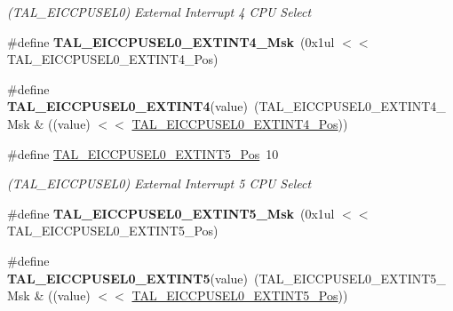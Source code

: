 \begin{DoxyCompactItemize}
\begin{DoxyCompactList}\small\item\em (T\+A\+L\+\_\+\+E\+I\+C\+C\+P\+U\+S\+E\+L0) External Interrupt 4 C\+P\+U Select \end{DoxyCompactList}\item 
\hypertarget{group___s_a_m_l21___t_a_l_ga9080df94c0c1a796c89316d313a6b49e}{}\#define {\bfseries T\+A\+L\+\_\+\+E\+I\+C\+C\+P\+U\+S\+E\+L0\+\_\+\+E\+X\+T\+I\+N\+T4\+\_\+\+Msk}~(0x1ul $<$$<$ T\+A\+L\+\_\+\+E\+I\+C\+C\+P\+U\+S\+E\+L0\+\_\+\+E\+X\+T\+I\+N\+T4\+\_\+\+Pos)\label{group___s_a_m_l21___t_a_l_ga9080df94c0c1a796c89316d313a6b49e}

\item 
\hypertarget{group___s_a_m_l21___t_a_l_ga6c6ce30ffe093c29e71b6a7fa98b4709}{}\#define {\bfseries T\+A\+L\+\_\+\+E\+I\+C\+C\+P\+U\+S\+E\+L0\+\_\+\+E\+X\+T\+I\+N\+T4}(value)~(T\+A\+L\+\_\+\+E\+I\+C\+C\+P\+U\+S\+E\+L0\+\_\+\+E\+X\+T\+I\+N\+T4\+\_\+\+Msk \& ((value) $<$$<$ \hyperlink{group___s_a_m_l21___t_a_l_gabf21e1c2dfcc285c676b41993b40dadd}{T\+A\+L\+\_\+\+E\+I\+C\+C\+P\+U\+S\+E\+L0\+\_\+\+E\+X\+T\+I\+N\+T4\+\_\+\+Pos}))\label{group___s_a_m_l21___t_a_l_ga6c6ce30ffe093c29e71b6a7fa98b4709}

\item 
\hypertarget{group___s_a_m_l21___t_a_l_ga9b495a36373e9ca710d53e7a55e7f016}{}\#define \hyperlink{group___s_a_m_l21___t_a_l_ga9b495a36373e9ca710d53e7a55e7f016}{T\+A\+L\+\_\+\+E\+I\+C\+C\+P\+U\+S\+E\+L0\+\_\+\+E\+X\+T\+I\+N\+T5\+\_\+\+Pos}~10\label{group___s_a_m_l21___t_a_l_ga9b495a36373e9ca710d53e7a55e7f016}

\begin{DoxyCompactList}\small\item\em (T\+A\+L\+\_\+\+E\+I\+C\+C\+P\+U\+S\+E\+L0) External Interrupt 5 C\+P\+U Select \end{DoxyCompactList}\item 
\hypertarget{group___s_a_m_l21___t_a_l_gaa1b8d5d4fdfd744dd8d7fe0d73b362a1}{}\#define {\bfseries T\+A\+L\+\_\+\+E\+I\+C\+C\+P\+U\+S\+E\+L0\+\_\+\+E\+X\+T\+I\+N\+T5\+\_\+\+Msk}~(0x1ul $<$$<$ T\+A\+L\+\_\+\+E\+I\+C\+C\+P\+U\+S\+E\+L0\+\_\+\+E\+X\+T\+I\+N\+T5\+\_\+\+Pos)\label{group___s_a_m_l21___t_a_l_gaa1b8d5d4fdfd744dd8d7fe0d73b362a1}

\item 
\hypertarget{group___s_a_m_l21___t_a_l_gab7fbd7d0d232c592ad5cca3b69a79319}{}\#define {\bfseries T\+A\+L\+\_\+\+E\+I\+C\+C\+P\+U\+S\+E\+L0\+\_\+\+E\+X\+T\+I\+N\+T5}(value)~(T\+A\+L\+\_\+\+E\+I\+C\+C\+P\+U\+S\+E\+L0\+\_\+\+E\+X\+T\+I\+N\+T5\+\_\+\+Msk \& ((value) $<$$<$ \hyperlink{group___s_a_m_l21___t_a_l_ga9b495a36373e9ca710d53e7a55e7f016}{T\+A\+L\+\_\+\+E\+I\+C\+C\+P\+U\+S\+E\+L0\+\_\+\+E\+X\+T\+I\+N\+T5\+\_\+\+Pos}))\label{group___s_a_m_l21___t_a_l_gab7fbd7d0d232c592ad5cca3b69a79319}


\end{DoxyCompactItemize}
